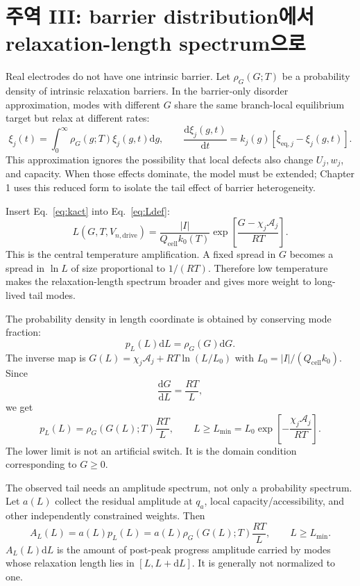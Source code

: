 \documentclass[11pt,a4paper]{article}
\newcommand{\dd}{\mathrm{d}}
\newcommand{\eq}{\mathrm{eq}}
\newcommand{\drive}{\mathrm{drive}}
\newcommand{\cell}{\mathrm{cell}}
\begin{document}
\section{주역 III: barrier distribution에서 relaxation-length spectrum으로}\label{sec:spectrum}
Real electrodes do not have one intrinsic barrier. Let $\rho_G(G;T)$ be a probability density of intrinsic relaxation barriers. In the
barrier-only disorder approximation, modes with different $G$ share the same branch-local equilibrium target but relax at different rates:
\begin{equation}
\xi_j(t)=\int_0^\infty \rho_G(g;T)\xi_j(g,t)\dd g,
\qquad
\frac{\dd\xi_j(g,t)}{\dd t}=k_j(g)[\xi_{\eq,j}-\xi_j(g,t)].
\label{eq:xi_dist}
\end{equation}
This approximation ignores the possibility that local defects also change $U_j,w_j$, and capacity. When those effects dominate, the model
must be extended; Chapter 1 uses this reduced form to isolate the tail effect of barrier heterogeneity.

Insert Eq.~\eqref{eq:kact} into Eq.~\eqref{eq:Ldef}:
\begin{equation}
\boxed{\;L(G,T,V_{n,\drive})=\frac{|I|}{Q_{\cell}k_0(T)}
\exp\left[\frac{G-\chi_j\mathcal A_j}{RT}\right].\;}
\label{eq:L_of_G}
\end{equation}
This is the central temperature amplification. A fixed spread in $G$ becomes a spread in $\ln L$ of size proportional to $1/(RT)$. Therefore
low temperature makes the relaxation-length spectrum broader and gives more weight to long-lived tail modes.

The probability density in length coordinate is obtained by conserving mode fraction:
\begin{equation}
p_L(L)\dd L=\rho_G(G)\dd G.
\end{equation}
The inverse map is $G(L)=\chi_j\mathcal A_j+RT\ln(L/L_0)$ with $L_0=|I|/(Q_{\cell}k_0)$. Since
\begin{equation}
\frac{\dd G}{\dd L}=\frac{RT}{L},
\end{equation}
we get
\begin{equation}
\boxed{\;p_L(L)=\rho_G(G(L);T)\frac{RT}{L},\qquad L\ge L_{\min}=L_0\exp\left[-\frac{\chi_j\mathcal A_j}{RT}\right].\;}
\label{eq:spectrum_prob}
\end{equation}
The lower limit is not an artificial switch. It is the domain condition corresponding to $G\ge0$.

The observed tail needs an amplitude spectrum, not only a probability spectrum. Let $a(L)$ collect the residual amplitude at $q_a$, local
capacity/accessibility, and other independently constrained weights. Then
\begin{equation}
\boxed{\;A_L(L)=a(L)p_L(L)=a(L)\rho_G(G(L);T)\frac{RT}{L},\qquad L\ge L_{\min}.\;}
\label{eq:spectrum}
\end{equation}
$A_L(L)\dd L$ is the amount of post-peak progress amplitude carried by modes whose relaxation length lies in $[L,L+\dd L]$. It is generally
not normalized to one.
\end{document}
